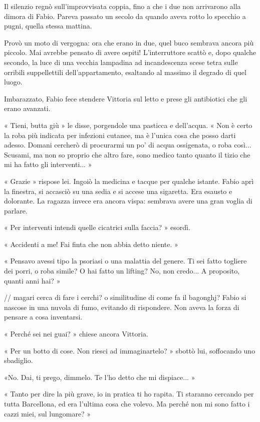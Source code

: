 Il silenzio regnò sull'improvvisata coppia, fino a che i due non arrivarono alla dimora di Fabio. Pareva passato un secolo da quando aveva rotto lo specchio a pugni, quella stessa mattina.

Provò un moto di vergogna: ora che erano in due, quel buco sembrava ancora più piccolo. Mai avrebbe pensato di avere ospiti! L'interruttore scattò e, dopo qualche secondo, la luce di una vecchia lampadina ad incandescenza scese tetra sulle orribili suppellettili dell'appartamento, esaltando al massimo il degrado di quel luogo.

Imbarazzato, Fabio fece stendere Vittoria sul letto e prese gli antibiotici che gli erano avanzati.

« Tieni, butta giù » le disse, porgendole una pasticca e dell'acqua. « Non è certo la roba più indicata per infezioni cutanee, ma è l'unica cosa che posso darti adesso. Domani cercherò di procurarmi un po' di acqua ossigenata, o roba così... Scusami, ma non so proprio che altro fare, sono medico tanto quanto il tizio che mi ha fatto gli interventi... »

« Grazie » rispose lei. Ingoiò la medicina e tacque per qualche istante. Fabio aprì la finestra, si accasciò su una sedia e si accese una sigaretta. Era esausto e dolorante. La ragazza invece era ancora vispa: sembrava avere una gran voglia di parlare.

« Per interventi intendi quelle cicatrici sulla faccia? » esordì.

« Accidenti a me! Fai finta che non abbia detto niente. »

« Pensavo avessi tipo la psoriasi o una malattia del genere. Ti sei fatto togliere dei porri, o roba simile? O hai fatto un lifting? No, non credo... A proposito, quanti anni hai? »

// magari cerca di fare i cerchi? o similitudine di come fa il bagonghj?
Fabio si nascose in una nuvola di fumo, evitando di rispondere. Non aveva la forza di pensare a cosa inventarsi.

« Perché sei nei guai? » chiese ancora Vittoria.

« Per un botto di cose. Non riesci ad immaginartelo? » sbottò lui, soffocando uno sbadiglio.

«No. Dai, ti prego, dimmelo. Te l'ho detto che mi dispiace... »

« Tanto per dire la più grave, io in pratica ti ho rapita. Ti staranno cercando per tutta Barcellona, ed era l'ultima cosa che volevo. Ma perché non mi sono fatto i cazzi miei, sul lungomare? »

